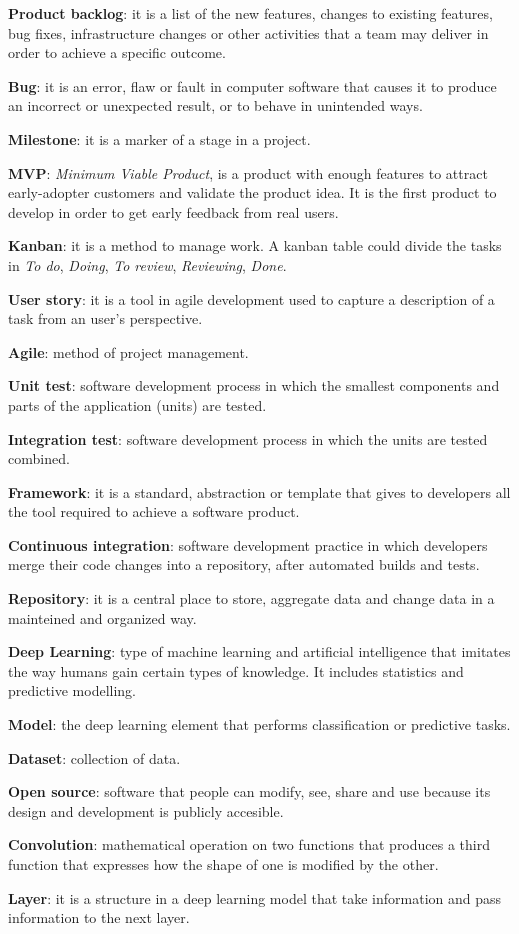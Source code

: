 \textbf{Product backlog}: it is a list of the new features, changes to existing features, bug fixes, infrastructure changes or other activities that a team may deliver in order to achieve a specific outcome. 
\bigskip

\textbf{Bug}: it is an error, flaw or fault in computer software that causes it to produce an incorrect or unexpected result, or to behave in unintended ways.
\bigskip

\textbf{Milestone}: it is a marker of a stage in a project. 
\bigskip

\textbf{MVP}: \textit{Minimum Viable Product}, is a product with enough features to attract early-adopter customers and validate the product idea. It is the first product to develop in order to get early feedback from real users.
\bigskip

\textbf{Kanban}: it is a method to manage work. A kanban table could divide the tasks in \textit{To do}, \textit{Doing}, \textit{To review}, \textit{Reviewing}, \textit{Done}. 
\bigskip

\textbf{User story}: it is a tool in agile development used to capture a description of a task from an user's perspective.
\bigskip

\textbf{Agile}: method of project management.
\bigskip

\textbf{Unit test}: software development process in which the smallest components and parts of the application (units) are tested.
\bigskip

\textbf{Integration test}: software development process in which the units are tested combined.
\bigskip

\textbf{Framework}: it is a standard, abstraction or template that gives to developers all the tool required to achieve a software product.
\bigskip

\textbf{Continuous integration}: software development practice in which developers merge their code changes into a repository, after automated builds and tests.
\bigskip

\textbf{Repository}: it is a central place to store, aggregate data and change data in a mainteined and organized way.
\bigskip

\textbf{Deep Learning}: type of machine learning and artificial intelligence that imitates the way humans gain certain types of knowledge. It includes statistics and predictive modelling.
\bigskip

\textbf{Model}: the deep learning element that performs classification or predictive tasks. 
\bigskip

\textbf{Dataset}: collection of data.
\bigskip

\textbf{Open source}: software that people can modify, see, share and use because its design and development is publicly accesible.
\bigskip

\textbf{Convolution}: mathematical operation on two functions that produces a third function that expresses how the shape of one is modified by the other.
\bigskip

\textbf{Layer}: it is a structure in a deep learning model that take information and pass information to the next layer.
\bigskip
